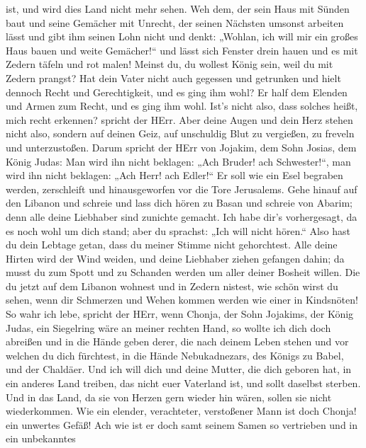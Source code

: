 ist, und wird dies Land nicht mehr sehen.  Weh dem, der
sein Haus mit Sünden baut und seine Gemächer mit Unrecht, der seinen
Nächsten umsonst arbeiten lässt und gibt ihm seinen Lohn nicht
 und denkt: „Wohlan, ich will mir ein großes Haus bauen und
weite Gemächer!{}`` und lässt sich Fenster drein hauen und es mit Zedern
täfeln und rot malen!  Meinst du, du wollest König sein,
weil du mit Zedern prangst? Hat dein Vater nicht auch gegessen und
getrunken und hielt dennoch Recht und Gerechtigkeit, und es ging ihm
wohl?  Er half dem Elenden und Armen zum Recht, und es ging
ihm wohl. Ist's nicht also, dass solches heißt, mich recht erkennen?
spricht der HErr.  Aber deine Augen und dein Herz stehen
nicht also, sondern auf deinen Geiz, auf unschuldig Blut zu vergießen,
zu freveln und unterzustoßen.  Darum spricht der HErr von
Jojakim, dem Sohn Josias, dem König Judas: Man wird ihn nicht beklagen:
„Ach Bruder! ach Schwester!{}``, man wird ihn nicht beklagen: „Ach Herr!
ach Edler!{}``  Er soll wie ein Esel begraben werden,
zerschleift und hinausgeworfen vor die Tore Jerusalems. 
Gehe hinauf auf den Libanon und schreie und lass dich hören zu Basan und
schreie von Abarim; denn alle deine Liebhaber sind zunichte gemacht.
 Ich habe dir's vorhergesagt, da es noch wohl um dich
stand; aber du sprachst: „Ich will nicht hören.`` Also hast du dein
Lebtage getan, dass du meiner Stimme nicht gehorchtest. 
Alle deine Hirten wird der Wind weiden, und deine Liebhaber ziehen
gefangen dahin; da musst du zum Spott und zu Schanden werden um aller
deiner Bosheit willen.  Die du jetzt auf dem Libanon
wohnest und in Zedern nistest, wie schön wirst du sehen, wenn dir
Schmerzen und Wehen kommen werden wie einer in Kindsnöten! 
So wahr ich lebe, spricht der HErr, wenn Chonja, der Sohn Jojakims, der
König Judas, ein Siegelring wäre an meiner rechten Hand, so wollte ich
dich doch abreißen  und in die Hände geben derer, die nach
deinem Leben stehen und vor welchen du dich fürchtest, in die Hände
Nebukadnezars, des Königs zu Babel, und der Chaldäer.  Und
ich will dich und deine Mutter, die dich geboren hat, in ein anderes
Land treiben, das nicht euer Vaterland ist, und sollt daselbst sterben.
 Und in das Land, da sie von Herzen gern wieder hin wären,
sollen sie nicht wiederkommen.  Wie ein elender,
verachteter, verstoßener Mann ist doch Chonja! ein unwertes Gefäß! Ach
wie ist er doch samt seinem Samen so vertrieben und in ein unbekanntes
